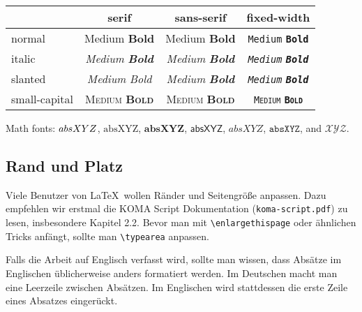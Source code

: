 \begin{tabular}{lccc}
\toprule
 & serif & sans-serif & fixed-width \\
\midrule
normal        & \textrm{\textup{Medium}} \textrm{\textup{\textbf{Bold}}} & \textsf{\textup{Medium}} \textsf{\textup{\textbf{Bold}}} & \texttt{\textup{Medium}} \texttt{\textup{\textbf{Bold}}} \\
italic        & \textrm{\textit{Medium}} \textrm{\textit{\textbf{Bold}}} & \textsf{\textit{Medium}} \textsf{\textit{\textbf{Bold}}} & \texttt{\textit{Medium}} \texttt{\textit{\textbf{Bold}}}\\
slanted       & \textrm{\textsl{Medium}} \textrm{\textsl{Bold}} & \textsf{\textsl{Medium}} \textsf{\textsl{\textbf{Bold}}} & \texttt{\textsl{Medium}} \texttt{\textsl{\textbf{Bold}}} \\
small-capital & \textrm{\textsc{Medium}} \textrm{\textsc{\textbf{Bold}}} & \textsf{\textsc{Medium}} \textsf{\textsc{\textbf{Bold}}} & \texttt{\textsc{Medium}} \texttt{\textsc{\textbf{Bold}}} \\
\bottomrule
\end{tabular}

Math fonts:
$\mathnormal{absXYZ}$,
$\mathrm{absXYZ}$,
$\mathbf{absXYZ}$,
$\mathsf{absXYZ}$,
$\mathit{absXYZ}$,
$\mathtt{absXYZ}$, and
$\mathcal{XYZ}$.

\subsection{Rand und Platz}

Viele Benutzer von \LaTeX\ wollen Ränder und Seitengröße anpassen.
Dazu empfehlen wir erstmal die KOMA Script Dokumentation (\texttt{koma-script.pdf}) zu lesen,
insbesondere Kapitel 2.2.
Bevor man mit \texttt{\textbackslash enlargethispage}
oder ähnlichen Tricks anfängt,
sollte man \texttt{\textbackslash typearea} anpassen.

Falls die Arbeit auf Englisch verfasst wird,
sollte man wissen, dass Absätze im Englischen üblicherweise anders formatiert werden.
Im Deutschen macht man eine Leerzeile zwischen Absätzen.
Im Englischen wird stattdessen die erste Zeile eines Absatzes eingerückt.
